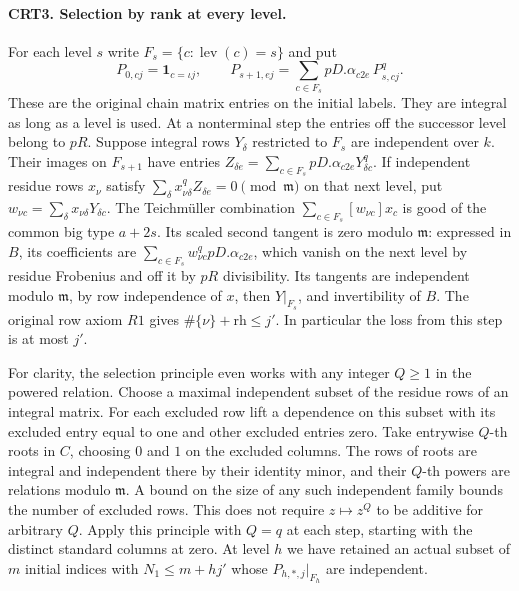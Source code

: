 \paragraph{CRT3. Selection by rank at every level.}
For each level $s$ write $F_s=\{c:\operatorname{lev}(c)=s\}$ and put
\[
 P_{0,cj}=\mathbf1_{c=\iota j},\qquad
 P_{s+1,ej}=\sum_{c\in F_s}pD.\alpha_{c2e}\,P_{s,cj}^{q}.
\]
These are the original chain matrix entries on the initial labels.
They are integral as long as a level is used. At a nonterminal
step the entries off the successor level belong to $pR$.
Suppose integral rows $Y_\delta$ restricted to $F_s$ are independent
over $k$. Their images on $F_{s+1}$ have entries
$Z_{\delta e}=\sum_{c\in F_s}pD.\alpha_{c2e}Y_{\delta c}^{q}$.
If independent residue rows $x_\nu$ satisfy
$\sum_\delta x_{\nu\delta}^{q}Z_{\delta e}=0\pmod{\mathfrak m}$
on that next level, put $w_{\nu c}=\sum_\delta x_{\nu\delta}Y_{\delta c}$.
The Teichm\"uller combination $\sum_{c\in F_s}[w_{\nu c}]x_c$
is good of the common big type $a+2s$. Its scaled second tangent
is zero modulo $\mathfrak m$: expressed in $B$, its coefficients
are $\sum_{c\in F_s} w_{\nu c}^{q}pD.\alpha_{c2e}$, which vanish on
the next level by residue Frobenius and off it by $pR$ divisibility.
Its tangents are independent modulo $\mathfrak m$, by row independence
of $x$, then $Y|_{F_s}$, and invertibility of $B$. The original
row axiom $R1$ gives $\#\{\nu\}+\mathrm{rh}\le j'$. In particular
the loss from this step is at most $j'$.

For clarity, the selection principle even works with any integer
$Q\ge1$ in the powered relation. Choose a maximal independent
subset of the residue rows of an integral matrix. For each excluded
row lift a dependence on this subset with its excluded entry equal to
one and other excluded entries zero. Take entrywise $Q$-th roots in
$C$, choosing $0$ and $1$ on the excluded columns. The rows of roots
are integral and independent there by their identity minor, and their
$Q$-th powers are relations modulo $\mathfrak m$. A bound on the
size of any such independent family bounds the number of excluded
rows. This does not require $z\mapsto z^Q$ to be additive for
arbitrary $Q$. Apply this principle with $Q=q$ at each step,
starting with the distinct standard columns at zero. At level $h$
we have retained an actual subset of $m$ initial indices with
$N_1\le m+h j'$ whose $P_{h,*,j}|_{F_h}$ are independent.

